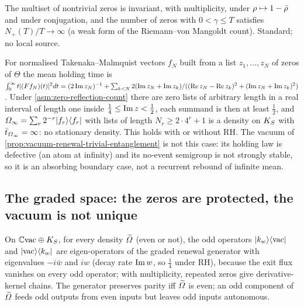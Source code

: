 \begin{assumption}
\label{asm:zero-reflection-count}
The multiset of nontrivial zeros is invariant, with multiplicity, under $\rho\mapsto1-\bar{\rho}$ and
under conjugation, and the number of zeros with $0<\gamma\le T$ satisfies $N_+(T)/T\to\infty$ (a weak
form of the Riemann--von Mangoldt count). Standard; no local source.
\end{assumption}

\begin{proposition}
\label{prop:infinite-mean-rebound}
For normalised Takenaka--Malmquist vectors $f_N$ built from a list $z_1,\dots,z_N$ of zeros of $\Theta$
the mean holding time is
$\int_0^\infty t|(Ff_N)(t)|^2dt = (2\operatorname{Im} z_N)^{-1} + \sum_{k<N}2(\operatorname{Im} z_N+\operatorname{Im} z_k)/
((\operatorname{Re} z_N-\operatorname{Re} z_k)^2+(\operatorname{Im} z_N+\operatorname{Im} z_k)^2)$. Under \cref{asm:zero-reflection-count} there are zero lists
of arbitrary length in a real interval of length one inside $\tfrac14\le\operatorname{Im} z<\tfrac12$, each summand
is then at least $\tfrac12$, and $\varOmega_{\infty} = \sum_r2^{-r}|f_r\rangle\langle f_r|$ with lists of length
$N_r\ge2\cdot4^r+1$ is a density on $K_S$ with $\bar t_{\varOmega_{\infty}} = \infty$: no stationary density.
This holds with or without RH. The vacuum of \cref{prop:vacuum-renewal-trivial-entanglement} is not
this case: its holding law is defective (an atom at infinity) and its no-event semigroup is not strongly
stable, so it is an absorbing boundary case, not a recurrent rebound of infinite mean.
\end{proposition}

\subsection{The graded space: the zeros are protected, the vacuum is not unique}

\begin{proposition}
\label{prop:odd-modes-protected}
On $\mathbb C\mathrm{vac}\oplus K_S$, for every density $\widetilde{\varOmega}$ (even or not), the odd operators
$|k_w\rangle\langle\mathrm{vac}|$ and $|\mathrm{vac}\rangle\langle k_w|$ are eigen-operators of the graded renewal
generator with eigenvalues $-i\bar w$ and $iw$ (decay rate $\operatorname{Im} w$, so $\tfrac14$ under RH), because the
exit flux vanishes on every odd operator; with multiplicity, repeated zeros give derivative-kernel
chains. The generator preserves parity iff $\widetilde{\varOmega}$ is even; an odd component of
$\widetilde{\varOmega}$ feeds odd outputs from even inputs but leaves odd inputs autonomous.
\end{proposition}

